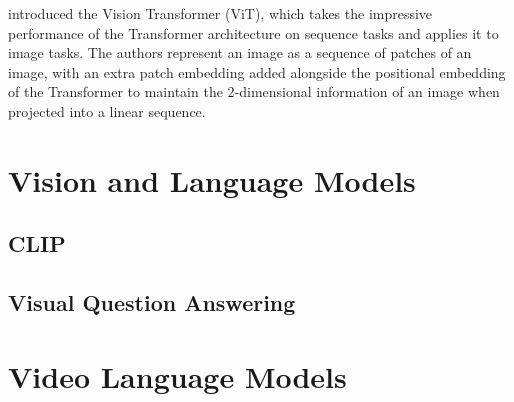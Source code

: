 \cite{dosovitskiy2021vit} introduced the Vision Transformer (ViT), which takes the impressive performance of the Transformer architecture on sequence tasks and applies it to image tasks. The authors represent an image as a sequence of patches of an image, with an extra patch embedding added alongside the positional embedding of the Transformer \cite{vaswani2017attention} to maintain the 2-dimensional information of an image when projected into a linear sequence. 

\section{Vision and Language Models}
\label{sec:vlm}

\subsection{CLIP}
\label{ssec:clip}

\subsection{Visual Question Answering}
\label{ssec:vqa}

\section{Video Language Models}
\label{sec:vidlm}

%
%
%
%
